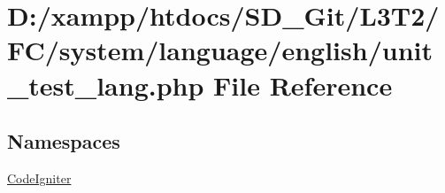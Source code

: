 \hypertarget{unit__test__lang_8php}{}\section{D\+:/xampp/htdocs/\+S\+D\+\_\+\+Git/\+L3\+T2/\+F\+C/system/language/english/unit\+\_\+test\+\_\+lang.php File Reference}
\label{unit__test__lang_8php}
\subsection*{Namespaces}
\begin{DoxyCompactItemize}
\item 
 \hyperlink{namespace_code_igniter}{Code\+Igniter}
\end{DoxyCompactItemize}
